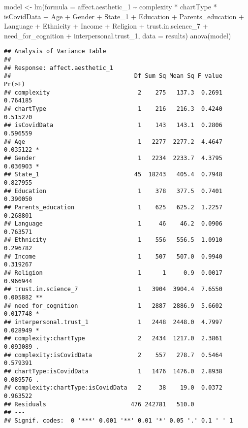 \documentclass[
]{article}
\newenvironment{Shaded}{\begin{snugshade}}{\end{snugshade}}
\newcommand{\AttributeTok}[1]{\textcolor[rgb]{0.77,0.63,0.00}{#1}}
\newcommand{\FunctionTok}[1]{\textcolor[rgb]{0.00,0.00,0.00}{#1}}
\newcommand{\NormalTok}[1]{#1}
\newcommand{\OtherTok}[1]{\textcolor[rgb]{0.56,0.35,0.01}{#1}}
\newcommand{\SpecialCharTok}[1]{\textcolor[rgb]{0.00,0.00,0.00}{#1}}
\begin{document}
\begin{Shaded}
\begin{Highlighting}[]
\NormalTok{model }\OtherTok{\textless{}{-}} \FunctionTok{lm}\NormalTok{(}\AttributeTok{formula =}\NormalTok{ affect.aesthetic\_1 }\SpecialCharTok{\textasciitilde{}}\NormalTok{ complexity }\SpecialCharTok{*}\NormalTok{ chartType }\SpecialCharTok{*}\NormalTok{ isCovidData }\SpecialCharTok{+}
\NormalTok{              Age }\SpecialCharTok{+}\NormalTok{ Gender }\SpecialCharTok{+}\NormalTok{ State\_1 }\SpecialCharTok{+}\NormalTok{ Education }\SpecialCharTok{+}\NormalTok{ Parents\_education }\SpecialCharTok{+}\NormalTok{ Language }\SpecialCharTok{+} 
\NormalTok{              Ethnicity }\SpecialCharTok{+}\NormalTok{ Income }\SpecialCharTok{+}\NormalTok{ Religion }\SpecialCharTok{+}\NormalTok{ trust.in.science\_7 }\SpecialCharTok{+} 
\NormalTok{              need\_for\_cognition }\SpecialCharTok{+}\NormalTok{ interpersonal.trust\_1,}
            \AttributeTok{data =}\NormalTok{ results)}
\FunctionTok{anova}\NormalTok{(model)}
\end{Highlighting}
\end{Shaded}

\begin{verbatim}
## Analysis of Variance Table
## 
## Response: affect.aesthetic_1
##                                   Df Sum Sq Mean Sq F value   Pr(>F)   
## complexity                         2    275   137.3  0.2691 0.764185   
## chartType                          1    216   216.3  0.4240 0.515270   
## isCovidData                        1    143   143.1  0.2806 0.596559   
## Age                                1   2277  2277.2  4.4647 0.035122 * 
## Gender                             1   2234  2233.7  4.3795 0.036903 * 
## State_1                           45  18243   405.4  0.7948 0.827955   
## Education                          1    378   377.5  0.7401 0.390050   
## Parents_education                  1    625   625.2  1.2257 0.268801   
## Language                           1     46    46.2  0.0906 0.763571   
## Ethnicity                          1    556   556.5  1.0910 0.296782   
## Income                             1    507   507.0  0.9940 0.319267   
## Religion                           1      1     0.9  0.0017 0.966944   
## trust.in.science_7                 1   3904  3904.4  7.6550 0.005882 **
## need_for_cognition                 1   2887  2886.9  5.6602 0.017748 * 
## interpersonal.trust_1              1   2448  2448.0  4.7997 0.028949 * 
## complexity:chartType               2   2434  1217.0  2.3861 0.093089 . 
## complexity:isCovidData             2    557   278.7  0.5464 0.579391   
## chartType:isCovidData              1   1476  1476.0  2.8938 0.089576 . 
## complexity:chartType:isCovidData   2     38    19.0  0.0372 0.963522   
## Residuals                        476 242781   510.0                    
## ---
## Signif. codes:  0 '***' 0.001 '**' 0.01 '*' 0.05 '.' 0.1 ' ' 1
\end{verbatim}
\end{document}
